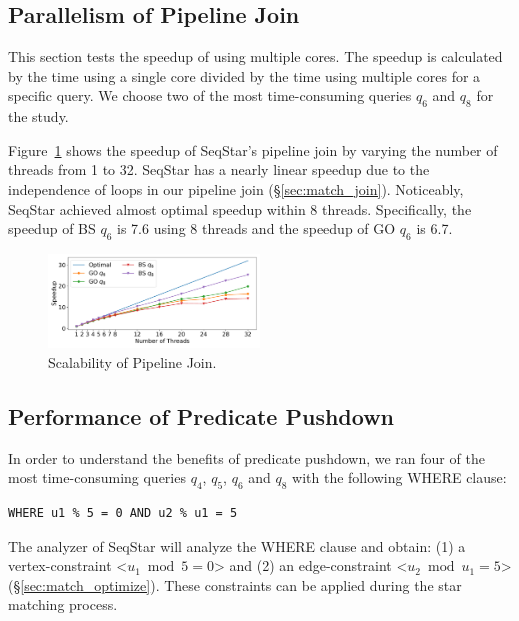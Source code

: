 \subsection{Parallelism of Pipeline Join}\label{sec:experiments_join}
This section tests the speedup of using multiple cores. The speedup is calculated by the time using a single core divided by the time using multiple cores for a specific query. 
We choose two of the most time-consuming queries $q_6$ and $q_8$ for the study.

Figure~\ref{img:exp_scalability} shows the speedup of SeqStar's pipeline join by varying the number of threads from 1 to 32.
SeqStar has a nearly linear speedup due to the independence of loops in our pipeline join (\S\ref{sec:match_join}).
Noticeably, SeqStar achieved almost optimal speedup within 8 threads.
Specifically, the speedup of BS $q_6$ is 7.6 using 8 threads and the speedup of GO $q_6$ is 6.7.
\begin{figure}[ht]
  \centering
  \includegraphics[width=0.5\textwidth]{img/exp_scalability.pdf}
  \caption{Scalability of Pipeline Join.}\label{img:exp_scalability}
\end{figure}

\subsection{Performance of Predicate Pushdown}
In order to understand the benefits of predicate pushdown,
we ran four of the most time-consuming queries $q_4$, $q_5$, $q_6$ and $q_8$ with the following WHERE clause:
\begin{Verbatim}[fontsize=\small]
  WHERE u1 % 5 = 0 AND u2 % u1 = 5
\end{Verbatim}
The analyzer of SeqStar will analyze the WHERE clause and obtain:
(1) a vertex-constraint <$u_1 \bmod 5 = 0$> and (2) an edge-constraint <$u_2 \bmod u_1 = 5$> (\S\ref{sec:match_optimize}).
These constraints can be applied during the star matching process.

